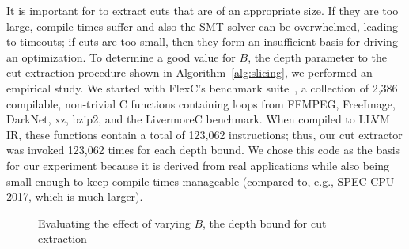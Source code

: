 It is important for \minotaur{} to extract cuts that are of an appropriate
size.
%
If they are too large, compile times suffer and also the SMT solver
can be overwhelmed, leading to timeouts; if cuts are too small, then
they form an insufficient basis for driving an optimization.
%
To determine a good value for $B$, the depth parameter to the cut
extraction procedure shown in Algorithm~\ref{alg:slicing}, we
performed an empirical study.
%
We started with FlexC's benchmark suite~\cite{woodruff2023rewriting},
a collection of 2,386 compilable, non-trivial C functions containing
loops from FFMPEG, FreeImage, DarkNet, xz, bzip2, and the LivermoreC
benchmark.
%
When compiled to LLVM IR, these functions contain a total of 123,062
instructions; thus, our cut extractor was invoked 123,062 times for
each depth bound.
%
We chose this code as the basis for our experiment because it is
derived from real applications while also being small enough to
keep compile times manageable (compared to, e.g., SPEC CPU 2017,
which is much larger).


\begin{figure}[tbp]
  \centering
  \hfill
  \hfill
  \caption{Evaluating the effect of varying $B$, the depth bound for
    cut extraction}
  \label{fig:loop}
\end{figure}


